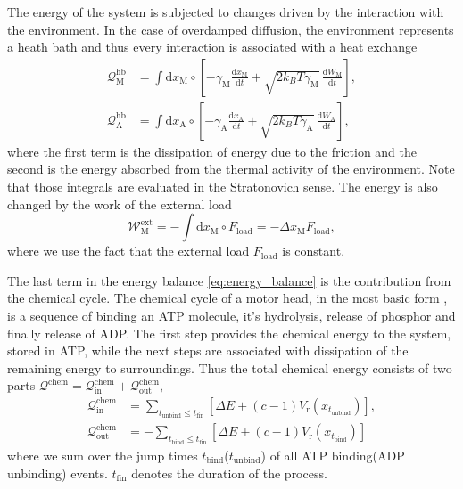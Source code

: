 \documentclass[aps,pre,twocolumn,showpacs,showkeys,superscriptaddress,floatfix]{revtex4-1}
\newcommand{\rmd}{{\mathrm d}}
\begin{document}
The energy of the system is subjected to changes driven by the interaction with the environment.
In the case of overdamped diffusion, the environment represents a heath bath
and thus every interaction is associated with a heat exchange \cite{Pesek2013}
\begin{align}
{\mathcal Q}_\text{M}^\text{hb} 
&= \int \rmd x_\text{M} \circ \left[ - \gamma_\text{M} \frac{\rmd x_\text{M} }{\rmd t} + \sqrt{ 2 k_B T \gamma_\text{M} } \, \frac{ \rmd W_\text{M} }{ \rmd t } \right] , 
\label{eq:heat_hb_M} \\
{\mathcal Q}_\text{A}^\text{hb} 
&= \int \rmd x_\text{A} \circ \left[ - \gamma_\text{A} \frac{\rmd x_\text{A} }{\rmd t} + \sqrt{ 2 k_B T \gamma_\text{A} } \, \frac{ \rmd W_\text{A} }{ \rmd t } \right] ,
\label{eq:heat_hb_A}
\end{align} 
where the first term is the dissipation of energy due to the friction and the second is the energy absorbed from the thermal activity of the environment.
Note that those integrals are evaluated in the Stratonovich sense.
The energy is also changed by the work of the external load 
\begin{equation}
{\mathcal W}^\text{ext}_\text{M} = - \int \rmd x_\text{M} \circ F_\text{load} = - \Delta x_\text{M} F_\text{load}, 
\label{eq:work_load}
\end{equation}
where we use the fact that the external load $F_\text{load}$ is constant. 

The last term in the energy balance \eqref{eq:energy_balance} is the contribution from the chemical cycle. 
The chemical cycle of a motor head, in the most basic form \cite{astumian1996mechanochemical,Bierbaum2011,Bierbaum2013,Albert2014}, is a sequence of binding an ATP molecule, it's hydrolysis, release of phosphor and finally release of ADP.
The first step provides the chemical energy to the system, stored in ATP, while the next steps are associated with dissipation of the remaining energy to surroundings.
Thus the total chemical energy consists of two parts ${\mathcal Q}^\text{chem} = {\mathcal Q}^\text{chem}_\text{in} + {\mathcal Q}^\text{chem}_\text{out}$,
\begin{align}
{\mathcal Q}_\text{in}^\text{chem} 
&= \sum_{t_\text{unbind} \leq t_\text{fin} } \left[ \Delta E + (c-1) V_\text{r}(x_{t_\text{unbind}}) \right] , 
\label{eq:q_in} \\
{\mathcal Q}_\text{out}^\text{chem} 
&= -\sum_{t_\text{bind} \leq t_\text{fin} } \left[ \Delta E + (c-1) V_\text{r}(x_{t_\text{bind}}) \right] 
\label{eq:q_out}
\end{align}
where we sum over the jump times $t_\text{bind}$($t_\text{unbind}$) of all ATP binding(ADP unbinding) events.
$t_\text{fin}$ denotes the duration of the process. 
\end{document}

